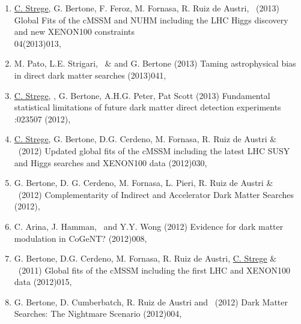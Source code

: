 \begin{enumerate}
\item 
\onestar \paper 
{\ul{C. Strege}, G. Bertone, F. Feroz, M. Fornasa, R. Ruiz de Austri, \rt\ (2013)}
{Global Fits of the cMSSM and NUHM including the LHC Higgs discovery and new XENON100 constraints}
{\JCAP\\ 04(2013)013, }

\item
\paper 
{M. Pato, L.E. Strigari, \rt\ \& and G. Bertone (2013)} 
{Taming astrophysical bias in direct dark matter searches}
{(2013)041, }
 
\item
\paper
{\ul{C. Strege}, \rt, G. Bertone, A.H.G. Peter, Pat Scott (2013)}
{Fundamental statistical limitations of future dark matter direct detection experiments}
{:023507 (2012), \\}

\item
\onestar \paper 
{\ul{C. Strege}, G. Bertone, D.G. Cerdeno, M. Fornasa, R. Ruiz de Austri \& \rt~(2012)}
{Updated global fits of the cMSSM including the latest LHC SUSY and Higgs searches and XENON100 data}
{(2012)030, }

\item
\paper 
{G. Bertone, D. G. Cerdeno, M. Fornasa, L. Pieri, R. Ruiz de Austri \& \rt~(2012)}
{Complementarity of Indirect and Accelerator Dark Matter Searches}
{ (2012), \\}

\item
\paper 
{C. Arina, J. Hamman, \rt\ and Y.Y. Wong (2012)}
{Evidence for dark matter modulation in CoGeNT?}
{(2012)008, }

\item
\paper
{G. Bertone, D.G. Cerdeno, M. Fornasa, R. Ruiz de Austri, \ul{C. Strege} \& \rt~(2011)}
{Global fits of the cMSSM including the first LHC and XENON100 data}
{(2012)015, }
 
\item
\paper
{G. Bertone, D. Cumberbatch, R. Ruiz de Austri and \rt~(2012)}
{Dark Matter Searches: The Nightmare Scenario}
{(2012)004, }


\end{enumerate}
